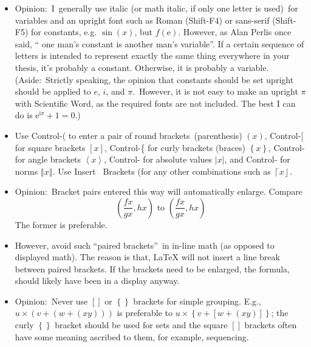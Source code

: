 \begin{itemize}
\item Opinion:\ I\ generally use italic (or math italic, if only one letter
is used)\ for variables and \textrm{an upright font such as Roman}
(Shift-F4) or \textsf{sans-serif} (Shift-F5) for constants, e.g. $\sin (x)$,
but $f(\mathrm{e})$. However, as Alan Perlis once said, \textquotedblleft
one man's constant is another man's variable\textquotedblright . If a
certain sequence of letters is intended to represent exactly the same thing
everywhere in your thesis, it's probably a constant. Otherwise, it is
probably a variable. (Aside:\ Strictly speaking, the opinion that constants
should be set upright should be applied to $e$, $i$, and $\pi $.\ However,
it is not easy to make an upright $\pi $ with Scientific Word, as the
required fonts are not included. The best I can do is $\mathrm{e}^{\mathrm{i}%
\pi }+1=0$.)

\item Use Control-( to enter a pair of round brackets\ (parenthesis) $\left(
x\right) $, Control-[ for square brackets $\left[ x\right] $, Control-\{ for
curly brackets (braces) $\left\{ x\right\} $, Control-\TEXTsymbol{<} for
angle brackets $\left\langle x\right\rangle $, Control-\TEXTsymbol{\backslash%
} for absolute values $\left\vert x\right\vert $, and Control-\TEXTsymbol{%
\vert} for norms $\left\Vert x\right\Vert $. Use Insert \TEXTsymbol{>}%
\TEXTsymbol{>}\ Brackets (for any other combinations such as $\left\lceil
x\right\rfloor $.

\item Opinion:\ Bracket pairs entered this way will automatically enlarge.
Compare 
\begin{equation*}
\left( \frac{fx}{gx},hx\right) \text{ to }(\frac{fx}{gx},hx)
\end{equation*}%
The former is preferable.

\item However, avoid such \textquotedblleft paired
brackets\textquotedblright\ in in-line math (as opposed to displayed math).
The reason is that, LaTeX will not insert a line break between paired
brackets. If the brackets need to be enlarged, the formula, should likely
have been in a display anyway.

\item Opinion:\ Never use $\left[ {}\right] $ or $\left\{ {}\right\} $
brackets for simple grouping. E.g., $u\times \left( v+\left( w+\left(
xy\right) \right) \right) $ is preferable to $u\times \left\{ v+\left[
w+\left( xy\right) \right] \right\} $; the curly $\left\{ {}\right\} $
bracket should be used for sets and the square $\left[ {}\right] $ brackets
often have some meaning ascribed to them, for example, sequencing.


\end{itemize}

